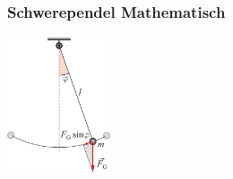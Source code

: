 \subsubsection{Schwerependel Mathematisch}
\begin{center}
	\begin{minipage}{0.3\textwidth}
	\end{minipage}%
	\begin{minipage}{0.3\textwidth}
		\includegraphics[height=4cm,keepaspectratio=true]{Images/schwerependel_mathematisch.png}
	\end{minipage}
\end{center}

\begin{center}
	\begin{minipage}{0.3\textwidth}
		 \\
		 \\
		 \\
	\end{minipage}%
	\begin{minipage}{0.3\textwidth}
		 \\
		 \\
		 \\
	\end{minipage}
\end{center}




